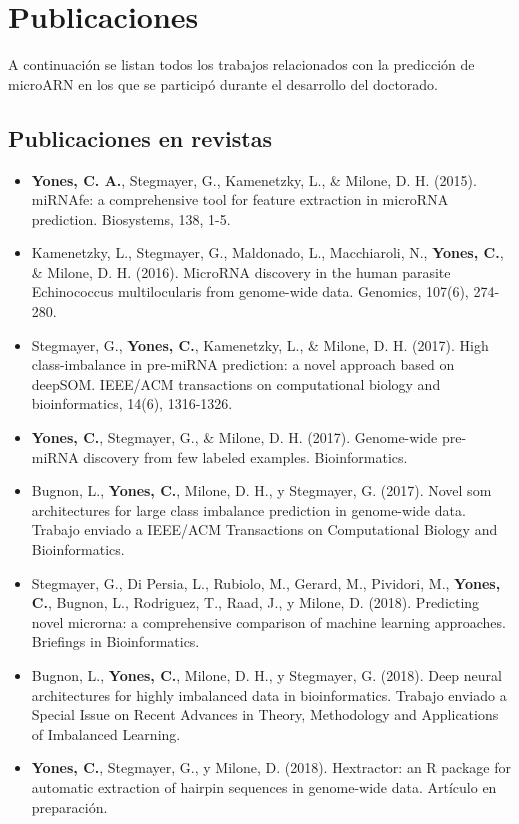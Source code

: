 \chapter{Publicaciones}
A continuación se listan todos los trabajos relacionados con la predicción de microARN en los que se participó durante el desarrollo del doctorado.

\section*{Publicaciones en revistas}
\begin{itemize}
	\item \textbf{Yones, C. A.}, Stegmayer, G., Kamenetzky, L., \& Milone, D. H. (2015). miRNAfe: a comprehensive tool for feature extraction in microRNA prediction. Biosystems, 138, 1-5.
	\item Kamenetzky, L., Stegmayer, G., Maldonado, L., Macchiaroli, N., \textbf{Yones, C.}, \& Milone, D. H. (2016). MicroRNA discovery in the human parasite Echinococcus multilocularis from genome-wide data. Genomics, 107(6), 274-280.
	\item Stegmayer, G., \textbf{Yones, C.}, Kamenetzky, L., \& Milone, D. H. (2017). High class-imbalance in pre-miRNA prediction: a novel approach based on deepSOM. IEEE/ACM transactions on computational biology and bioinformatics, 14(6), 1316-1326.
	\item \textbf{Yones, C.}, Stegmayer, G., \& Milone, D. H. (2017). Genome-wide pre-miRNA discovery from few labeled examples. Bioinformatics.
	\item Bugnon, L., \textbf{Yones, C.}, Milone, D. H., y Stegmayer, G. (2017). Novel som architectures for large class imbalance prediction in genome-wide data. Trabajo enviado a IEEE/ACM Transactions on Computational Biology and Bioinformatics.
	\item Stegmayer, G., Di Persia, L., Rubiolo, M., Gerard, M., Pividori, M., \textbf{Yones, C.}, Bugnon, L., Rodriguez, T., Raad, J., y Milone, D. (2018). Predicting novel microrna: a comprehensive comparison of machine learning approaches. Briefings in Bioinformatics.
	\item Bugnon, L., \textbf{Yones, C.}, Milone, D. H., y Stegmayer, G. (2018). Deep neural architectures for highly imbalanced data in bioinformatics. Trabajo enviado a Special Issue on Recent Advances in Theory, Methodology and Applications of Imbalanced Learning.
	\item \textbf{Yones, C.}, Stegmayer, G., y Milone, D. (2018). Hextractor: an R package for automatic extraction of hairpin sequences in genome-wide data. Artículo en preparación.
\end{itemize}


